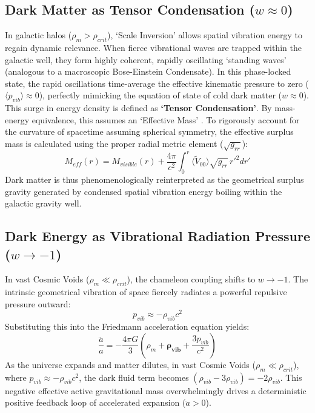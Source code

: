 \documentclass[reprint,amsmath,amssymb,aps,prd]{revtex4-2}
\begin{document}
\subsection{Dark Matter as Tensor Condensation ($w \approx 0$)}
In galactic halos ($\rho_m > \rho_{crit}$), `Scale Inversion' allows spatial vibration energy to regain dynamic relevance.
When fierce vibrational waves are trapped within the galactic well, they form highly coherent, rapidly oscillating `standing waves' (analogous to a macroscopic Bose-Einstein Condensate).
In this phase-locked state, the rapid oscillations time-average the effective kinematic pressure to zero ($\langle p_{vib} \rangle \approx 0$), perfectly mimicking the equation of state of cold dark matter ($w \approx 0$).
This surge in energy density is defined as \textbf{`Tensor Condensation'}. By mass-energy equivalence, this assumes an `Effective Mass' \cite{Verlinde2017}.
To rigorously account for the curvature of spacetime assuming spherical symmetry, the effective surplus mass is calculated using the proper radial metric element ($\sqrt{g_{rr}}$):
\begin{equation}
M_{eff}(r) = M_{visible}(r) + \frac{4\pi}{c^2} \int_{0}^{r} \langle \tilde{V}_{00} \rangle \sqrt{g_{rr}} \, r'^2 dr'
\end{equation}
Dark matter is thus phenomenologically reinterpreted as the geometrical surplus gravity generated by condensed spatial vibration energy boiling within the galactic gravity well.

\subsection{Dark Energy as Vibrational Radiation Pressure ($w \to -1$)}
In vast Cosmic Voids ($\rho_m \ll \rho_{crit}$), the chameleon coupling shifts to $w \to -1$.
The intrinsic geometrical vibration of space fiercely radiates a powerful repulsive pressure outward:
\begin{equation}
p_{vib} \approx -\rho_{vib} c^2
\end{equation}
Substituting this into the Friedmann acceleration equation yields:
\begin{equation}
\frac{\ddot{a}}{a} = -\frac{4\pi G}{3} \left( \rho_m + \mathbf{\rho_{vib}} + \frac{3p_{vib}}{c^2} \right)
\end{equation}
As the universe expands and matter dilutes, in vast Cosmic Voids ($\rho_m \ll \rho_{crit}$), where $p_{vib} \approx -\rho_{vib} c^2$, the dark fluid term becomes $(\rho_{vib} - 3\rho_{vib}) = -2\rho_{vib}$.
This negative effective active gravitational mass overwhelmingly drives a deterministic positive feedback loop of accelerated expansion ($\ddot{a}>0$).
\end{document}
